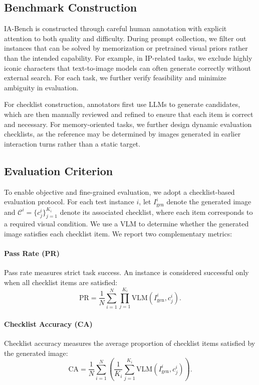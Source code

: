 \documentclass{llmxive}
\begin{document}
\subsection{Benchmark Construction}

IA-Bench is constructed through careful human annotation with explicit attention to both quality and difficulty. During prompt collection, we filter out instances that can be solved by memorization or pretrained visual priors rather than the intended capability. For example, in IP-related tasks, we exclude highly iconic characters that text-to-image models can often generate correctly without external search. For each task, we further verify feasibility and minimize ambiguity in evaluation.

For checklist construction, annotators first use LLMs to generate candidates, which are then manually reviewed and refined to ensure that each item is correct and necessary. For memory-oriented tasks, we further design dynamic evaluation checklists, as the reference may be determined by images generated in earlier interaction turns rather than a static target.

\subsection{Evaluation Criterion}

To enable objective and fine-grained evaluation, we adopt a checklist-based evaluation protocol. For each test instance $i$, let $I^{i}_{\mathrm{gen}}$ denote the generated image and $\mathcal{C}^{i} = \{c^{i}_{j}\}_{j=1}^{K_i}$ denote its associated checklist, where each item corresponds to a required visual condition. We use a VLM to determine whether the generated image satisfies each checklist item. We report two complementary metrics:

\paragraph{Pass Rate (PR)}
Pass rate measures strict task success. An instance is considered successful only when all checklist items are satisfied:
\[
\mathrm{PR} = \frac{1}{N}\sum_{i=1}^{N}\prod_{j=1}^{K_i} \mathrm{VLM}(I^{i}_{\mathrm{gen}}, c^{i}_{j}).
\]

\paragraph{Checklist Accuracy (CA)}
Checklist accuracy measures the average proportion of checklist items satisfied by the generated image:
\[
\mathrm{CA} = \frac{1}{N}\sum_{i=1}^{N}\left(\frac{1}{K_i}\sum_{j=1}^{K_i} \mathrm{VLM}(I^{i}_{\mathrm{gen}}, c^{i}_{j})\right).
\]
\end{document}
